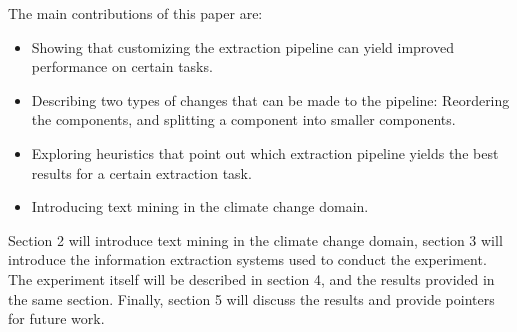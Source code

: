 The main contributions of this paper are:

\begin{itemize}

\item Showing that customizing the extraction pipeline can yield improved performance on certain tasks.

\item Describing two types of changes that can be made to the pipeline: Reordering the components, and splitting a component into smaller components.

\item Exploring heuristics that point out which extraction pipeline yields the best results for a certain extraction task.

\item Introducing text mining in the climate change domain.

\end{itemize}


Section 2 will introduce text mining in the climate change domain, section 3 will introduce the information extraction systems used to conduct the experiment. The experiment itself will be described in section 4, and the results provided in the same section. Finally, section 5 will discuss the results and provide pointers for future work. 

